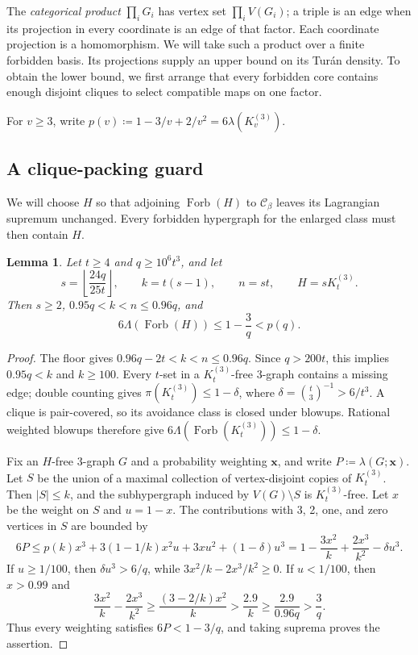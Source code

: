 \documentclass[10pt]{article}
\numberwithin{equation}{section}
\newtheorem{lemma}[lemma]{Lemma}\aliascntresetthe{lemma}
\theoremstyle{definition}
\newcommand{\Forb}{\operatorname{Forb}}\newcommand{\Ext}{\operatorname{Ext}}
\newcommand{\x}{\boldsymbol{x}}\newcommand{\y}{\boldsymbol{y}}
\begin{document}
The \emph{categorical product} $\prod_i G_i$ has vertex set $\prod_i V(G_i)$; a triple is an edge when its projection in every coordinate is an edge of that factor. Each coordinate projection is a homomorphism. We will take such a product over a finite forbidden basis. Its projections supply an upper bound on its Tur\'an density. To obtain the lower bound, we first arrange that every forbidden core contains enough disjoint cliques to select compatible maps on one factor.

For $v\ge3$, write $p(v)\coloneqq1-3/v+2/v^2=6\lambda(K_v^{(3)})$.

\subsection{A clique-packing guard}\label{sec:safe-guard}
We will choose $H$ so that adjoining $\Forb(H)$ to $\mathcal C_\beta$ leaves its Lagrangian supremum unchanged. Every forbidden hypergraph for the enlarged class must then contain $H$.

\begin{lemma}\label{lem:safe-simple-packing}
Let $t\ge4$ and $q\ge10^6t^3$, and let
\[
 s=\left\lfloor\frac{24q}{25t}\right\rfloor,\qquad
 k=t(s-1),\qquad n=st,\qquad H=sK_t^{(3)}.
\]
Then $s\ge2$, $0.95q<k<n\le0.96q$, and
\[
 6\Lambda(\Forb(H))\le1-\frac3q<p(q).
\]
\end{lemma}
\begin{proof}
The floor gives $0.96q-2t<k<n\le0.96q$. Since $q>200t$, this implies $0.95q<k$ and $k\ge100$. Every $t$-set in a $K_t^{(3)}$-free $3$-graph contains a missing edge; double counting gives $\pi(K_t^{(3)})\le1-\delta$, where $\delta=\binom t3^{-1}>6/t^3$. A clique is pair-covered, so its avoidance class is closed under blowups. Rational weighted blowups therefore give $6\Lambda(\Forb(K_t^{(3)}))\le1-\delta$.

Fix an $H$-free $3$-graph $G$ and a probability weighting $\x$, and write $P\coloneqq\lambda(G;\x)$. Let $S$ be the union of a maximal collection of vertex-disjoint copies of $K_t^{(3)}$. Then $|S|\le k$, and the subhypergraph induced by $V(G)\setminus S$ is $K_t^{(3)}$-free. Let $x$ be the weight on $S$ and $u=1-x$. The contributions with 3, 2, one, and zero vertices in $S$ are bounded by
\[
 6P\le p(k)x^3+3(1-1/k)x^2u+3xu^2+(1-\delta)u^3
      =1-\frac{3x^2}{k}+\frac{2x^3}{k^2}-\delta u^3.
\]
If $u\ge1/100$, then $\delta u^3>6/q$, while $3x^2/k-2x^3/k^2\ge0$. If $u<1/100$, then $x>0.99$ and
\[
 \frac{3x^2}{k}-\frac{2x^3}{k^2}
 \ge\frac{(3-2/k)x^2}{k}
 >\frac{2.9}{k}\ge\frac{2.9}{0.96q}>\frac3q.
\]
Thus every weighting satisfies $6P<1-3/q$, and taking suprema proves the assertion.
\end{proof}
\end{document}
